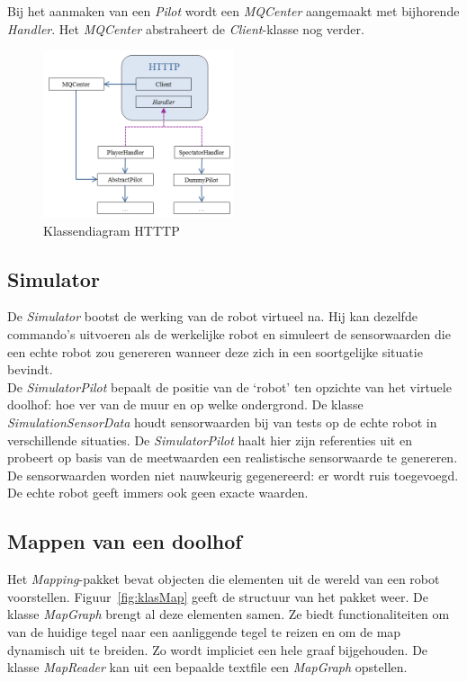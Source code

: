 \documentclass[tt3]{penoverslag}
\begin{document}
Bij het aanmaken van een \textit{Pilot} wordt een \textit{MQCenter} aangemaakt met bijhorende \textit{Handler}. Het \textit{MQCenter} abstraheert de \textit{Client}-klasse nog verder.

\begin{figure}[h]
\centering
	\includegraphics[width=0.5\textwidth]{KlasHTTTP}
\caption{Klassendiagram HTTTP}
\label{fig:klasHTTTP}
\end{figure}


\subsection{Simulator} 
\label{ssec:Sim}
De \textit{Simulator} bootst de werking van de robot virtueel na. Hij kan dezelfde commando's uitvoeren als de werkelijke robot en simuleert de sensorwaarden die een echte robot zou genereren wanneer deze zich in een soortgelijke situatie bevindt.\\

De \textit{SimulatorPilot} bepaalt de positie van de `robot' ten opzichte van het virtuele doolhof: hoe ver van de muur en op welke ondergrond. De klasse \textit{SimulationSensorData} houdt sensorwaarden bij van tests op de echte robot in verschillende situaties. De \textit{SimulatorPilot} haalt hier zijn referenties uit en probeert op basis van de meetwaarden een realistische sensorwaarde te genereren. De sensorwaarden worden niet nauwkeurig gegenereerd: er wordt ruis toegevoegd. De echte robot geeft immers ook geen exacte waarden.\\

\subsection{Mappen van een doolhof} %
\label{ssec:Mapping}
Het \textit{Mapping}-pakket bevat objecten die elementen uit de wereld van een robot voorstellen. Figuur~\ref{fig:klasMap} geeft de structuur van het pakket weer. De klasse \textit{MapGraph} brengt al deze elementen samen. Ze biedt functionaliteiten om van de huidige tegel naar een aanliggende tegel te reizen en om de map dynamisch uit te breiden. Zo wordt impliciet een hele graaf bijgehouden. De klasse \textit{MapReader} kan uit een bepaalde textfile een \textit{MapGraph} opstellen.\\
\end{document}
